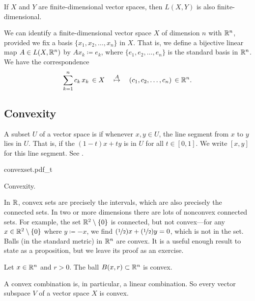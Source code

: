 \begin{prop} \label{prop:LXYfinitedim}
If $X$ and $Y$ are finite-dimensional vector spaces, then $L(X,Y)$
is also finite-dimensional.
\end{prop}

We can identify a finite-dimensional vector
space $X$ of dimension $n$ with ${\mathbb{R}}^n$, provided we fix a basis
$\{ x_1, x_2, \ldots, x_n \}$ in $X$.  That is, we define a bijective
linear map $A \in L(X,{\mathbb{R}}^n)$ by
$Ax_k \coloneqq e_k$, where $\{ e_1, e_2, \ldots, e_n \}$ is the standard
basis in ${\mathbb{R}}^n$.  We have
the correspondence
\begin{equation*}
\sum_{k=1}^n c_k \, x_k \, \in X
\quad
\overset{A}{\mapsto}
\quad
(c_1,c_2,\ldots,c_n) \, \in {\mathbb{R}}^n .
\end{equation*}

\subsection{Convexity}

A subset $U$ of a vector space is \emph{}
if whenever $x,y \in U$, the line segment from
$x$ to $y$ lies in $U$.  That is, if the \emph{}
$(1-t)x+ty$ is in $U$ for all $t \in [0,1]$.
We write $[x,y]$ for this line segment.
See .

\begin{myfigureht}
{convexset.pdf_t}
\caption{Convexity.\label{mv:convexcomb}}
\end{myfigureht}

In ${\mathbb{R}}$, convex sets are precisely the intervals, which are
also precisely the connected sets.
In two or more dimensions
there are lots of nonconvex connected sets.  For example,
the set ${\mathbb{R}}^2 \setminus \{0\}$ is connected,
but not convex---for any $x \in {\mathbb{R}}^2 \setminus \{0\}$ where $y \coloneqq -x$,
we find
$(\nicefrac{1}{2})x + (\nicefrac{1}{2})y = 0$, which is not in the set.
Balls (in the standard metric) in ${\mathbb{R}}^n$ are convex.  It is
a useful enough result to state as a proposition,
but we leave its proof as an exercise.

\begin{prop}
Let $x \in {\mathbb{R}}^n$ and $r > 0$.  The ball $B(x,r) \subset {\mathbb{R}}^n$
is convex.
\end{prop}

\begin{example}
A convex combination is, in particular, a linear combination.
So every vector subspace $V$ of a vector space $X$ is convex.
\end{example}

